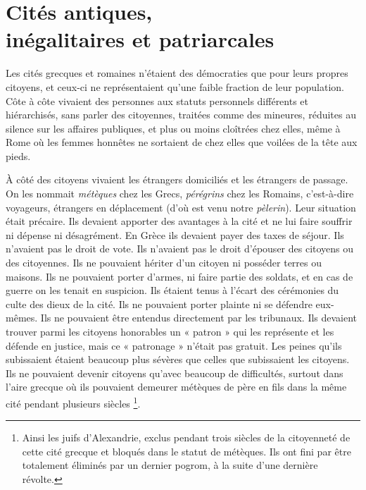 

\chapter[Cités antiques, inégalitaires et patriarcales]{Cités antiques,\\inégalitaires et patriarcales}


Les cités grecques et romaines n'étaient des démocraties que pour
leurs propres citoyens, et ceux-ci ne représentaient qu'une faible fraction de leur
population. Côte à côte vivaient des personnes aux statuts personnels
différents et hiérarchisés, sans parler des citoyennes, traitées comme des
mineures, réduites au silence sur les affaires publiques, et plus ou moins
cloîtrées chez elles, même à Rome où les femmes honnêtes ne sortaient
de chez elles que voilées de la tête aux pieds.

À côté des citoyens vivaient les étrangers domiciliés et les étrangers
de passage. On les nommait \emph{métèques} chez les Grecs, \emph{pérégrins} chez les
Romains, c'est-à-dire voyageurs, étrangers en déplacement (d'où est venu
notre \emph{pèlerin}). Leur situation était précaire. Ils devaient apporter des avantages
à la cité et ne lui faire souffrir ni dépense ni désagrément. En Grèce
ils devaient payer des taxes de séjour. Ils n'avaient pas le droit de vote. Ils
n'avaient pas le droit d'épouser des citoyens ou des citoyennes. Ils ne
pouvaient hériter d'un citoyen ni posséder terres ou maisons. Ils ne pouvaient
porter d'armes, ni faire partie des soldats, et en cas de guerre on
les tenait en suspicion. Ils étaient tenus à l'écart des cérémonies du culte
des dieux de la cité. Ils ne pouvaient porter plainte ni se défendre eux-mêmes.
Ils ne pouvaient être entendus directement par les tribunaux. Ils
devaient trouver parmi les citoyens honorables un « patron » qui les représente
et les défende en justice, mais ce « patronage » n'était pas gratuit.
Les peines qu'ils subissaient étaient beaucoup plus sévères que celles
que subissaient les citoyens. Ils ne pouvaient devenir citoyens qu'avec
beaucoup de difficultés, surtout dans l'aire grecque où ils pouvaient demeurer
métèques de père en fils dans la même cité pendant plusieurs siècles%
\footnote{Ainsi
les juifs d'Alexandrie, exclus pendant trois siècles de la citoyenneté de cette cité grecque et bloqués dans le statut de métèques. Ils ont fini par être totalement éliminés par un dernier pogrom, à la suite d'une dernière révolte.}.

